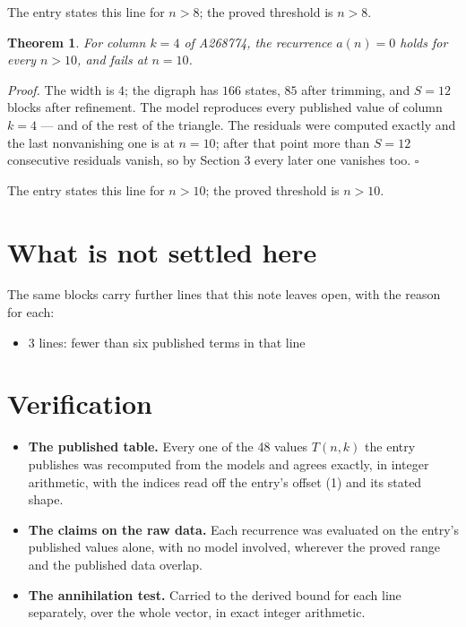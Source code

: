 \documentclass[11pt]{article}
\newtheorem{theorem}{Theorem}
\theoremstyle{definition}
\begin{document}
The entry states this line for $n > 8$; the proved threshold is $n > 8$.

\begin{theorem} For column $k = 4$ of A268774, the recurrence $a(n) = 0$ holds for every $n > 10$, and fails at $n = 10$.\end{theorem}

{\itshape Proof.} The width is $4$; the digraph has $166$ states, $85$ after trimming, and $S = 12$ blocks after refinement. The model reproduces every published value of column $k = 4$ --- and of the rest of the triangle. The residuals were computed exactly and the last nonvanishing one is at $n = 10$; after that point more than $S = 12$ consecutive residuals vanish, so by Section 3 every later one vanishes too. $\square$

The entry states this line for $n > 10$; the proved threshold is $n > 10$.

\section{What is not settled here}

The same blocks carry further lines that this note leaves open, with the reason for each:

\begin{itemize}

\item 3 lines: fewer than six published terms in that line

\end{itemize}

\section{Verification}

\begin{itemize}

\item {\bfseries The published table.} Every one of the 48 values $T(n,k)$ the entry publishes was recomputed from the models and agrees exactly, in integer arithmetic, with the indices read off the entry's offset (1) and its stated shape.

\item {\bfseries The claims on the raw data.} Each recurrence was evaluated on the entry's published values alone, with no model involved, wherever the proved range and the published data overlap.

\item {\bfseries The annihilation test.} Carried to the derived bound for each line separately, over the whole vector, in exact integer arithmetic.

\end{itemize}
\end{document}
